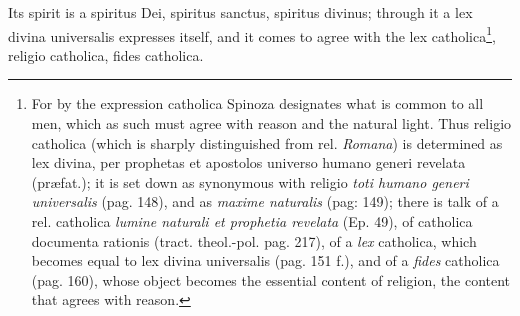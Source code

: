 \documentclass[12pt,a4paper,openany]{book}
\begin{document}
Its spirit is a spiritus Dei, spiritus sanctus, spiritus divinus; through it a lex divina universalis expresses itself, and it comes to agree with the lex catholica\footnote{For by the expression catholica Spinoza designates what is common to all men, which as such must agree with reason and the natural light. Thus religio catholica (which is sharply distinguished from rel. \emph{Romana}) is determined as lex divina, per prophetas et apostolos universo humano generi revelata (præfat.); it is set down as synonymous with religio \emph{toti humano generi universalis} (pag. 148), and as \emph{maxime naturalis} (pag: 149); there is talk of a rel. catholica \emph{lumine naturali et prophetia revelata} (Ep. 49), of catholica documenta rationis (tract. theol.-pol. pag. 217), of a \emph{lex} catholica, which becomes equal to lex divina universalis (pag. 151 f.), and of a \emph{fides} catholica (pag. 160), whose object becomes the essential content of religion, the content that agrees with reason.}, religio catholica, fides catholica.
\end{document}
